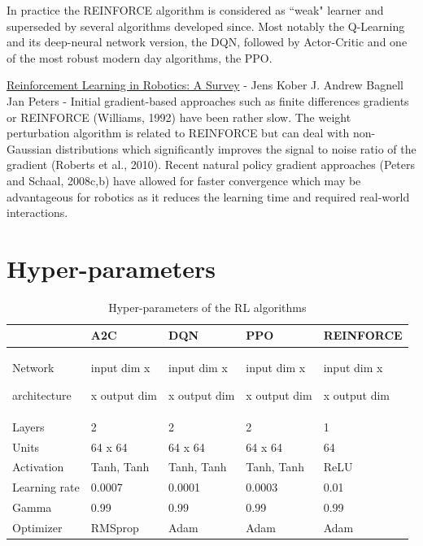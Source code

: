 \documentclass[a4paper, 12pt]{article}
\newcommand{\rowspace}[1]{\renewcommand{\arraystretch}{#1}}
\begin{document}
In practice the REINFORCE algorithm is considered as ``weak" learner and superseded by several algorithms developed since. Most notably the Q-Learning and its deep-neural network version, the DQN, followed by Actor-Critic and one of the most robust modern day algorithms, the PPO. 

\href{https://www.ri.cmu.edu/pub_files/2013/7/Kober_IJRR_2013.pdf}{Reinforcement Learning in Robotics: A Survey}  - Jens Kober J. Andrew Bagnell Jan Peters -   
Initial gradient-based approaches such as finite differences gradients or REINFORCE
(Williams, 1992) have been rather slow. The weight perturbation algorithm is related to
REINFORCE but can deal with non-Gaussian distributions which significantly improves
the signal to noise ratio of the gradient (Roberts et al., 2010). Recent natural policy
gradient approaches (Peters and Schaal, 2008c,b) have allowed for faster convergence
which may be advantageous for robotics as it reduces the learning time and required
real-world interactions.

	
\section{Hyper-parameters}

\begin{table}\centering
	\sffamily
	\rowspace{1.5}
	\begin{tabular}{L{2cm} R{2.5cm} R{2.5cm} R{2.5cm} R{3cm}}
		\toprule
		&\textbf{A2C}&\textbf{DQN}&\textbf{PPO}&\textbf{REINFORCE}\\ \midrule
		
		Network\par architecture&input dim x\par [64|Tanh x 64|Tanh]\par x output dim&input dim x\par [64|Tanh x 64|Tanh]\par x output dim&input dim x\par [64|Tanh x 64|Tanh]\par x output dim&input dim x\par [64|ReLU]\par x output dim\\
		Layers&2&2&2&1\\
		Units&64  x 64&64  x 64&64  x 64&64\\
		Activation&Tanh, Tanh&Tanh, Tanh&Tanh, Tanh&ReLU\\
		Learning rate&0.0007&0.0001&0.0003&0.01\\
		Gamma&0.99&0.99&0.99&0.99\\
		Optimizer&RMSprop&Adam&Adam&Adam\\
			
		\bottomrule
	\end{tabular}
	\caption{Hyper-parameters of the RL algorithms}
	\label{tbl:hyperparameters}
\end{table}
\end{document}
